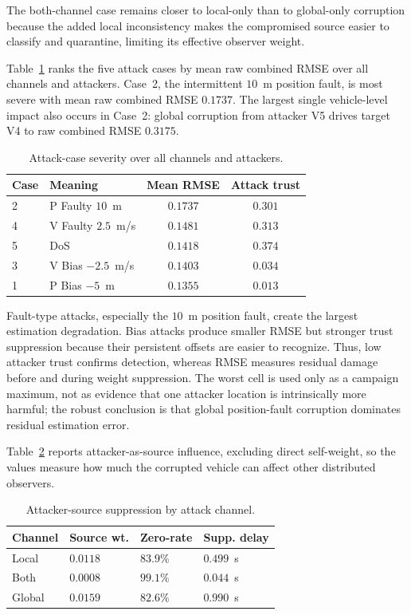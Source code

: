 \documentclass[letterpaper,journal]{IEEEtran}
\begin{document}
The both-channel case remains closer to local-only than to global-only corruption because the added local inconsistency makes the compromised source easier to classify and quarantine, limiting its effective observer weight.

Table~\ref{tab:case_ranking} ranks the five attack cases by mean raw combined RMSE over all channels and attackers. Case~2, the intermittent $10$~m position fault, is most severe with mean raw combined RMSE $0.1737$. The largest single vehicle-level impact also occurs in Case~2: global corruption from attacker V5 drives target V4 to raw combined RMSE $0.3175$.

\begin{table}[!t]
\centering
\caption{Attack-case severity over all channels and attackers.}
\label{tab:case_ranking}
\scriptsize
\begin{tabular}{p{0.7cm}p{2.55cm}cc}
\toprule
\textbf{Case} & \textbf{Meaning} & \textbf{Mean RMSE} & \textbf{Attack trust} \\
\midrule
2 & P Faulty $10$~m        & $0.1737$ & $0.301$ \\
4 & V Faulty $2.5$~m/s     & $0.1481$ & $0.313$ \\
5 & DoS                    & $0.1418$ & $0.374$ \\
3 & V Bias $-2.5$~m/s      & $0.1403$ & $0.034$ \\
1 & P Bias $-5$~m          & $0.1355$ & $0.013$ \\
\bottomrule
\end{tabular}
\end{table}

Fault-type attacks, especially the $10$~m position fault, create the largest estimation degradation. Bias attacks produce smaller RMSE but stronger trust suppression because their persistent offsets are easier to recognize. Thus, low attacker trust confirms detection, whereas RMSE measures residual damage before and during weight suppression. The worst cell is used only as a campaign maximum, not as evidence that one attacker location is intrinsically more harmful; the robust conclusion is that global position-fault corruption dominates residual estimation error.

Table~\ref{tab:source_suppression_by_channel} reports attacker-as-source influence, excluding direct self-weight, so the values measure how much the corrupted vehicle can affect other distributed observers.

\begin{table}[!t]
\centering
\caption{Attacker-source suppression by attack channel.}
\label{tab:source_suppression_by_channel}
\scriptsize
\begin{tabular}{p{1.0cm}p{1.45cm}p{1.25cm}p{1.65cm}}
\toprule
\textbf{Channel} & \textbf{Source wt.} & \textbf{Zero-rate} & \textbf{Supp. delay} \\
\midrule
Local  & $0.0118$ & $83.9\%$ & $0.499$~s \\
Both   & $0.0008$ & $99.1\%$ & $0.044$~s \\
Global & $0.0159$ & $82.6\%$ & $0.990$~s \\
\bottomrule
\end{tabular}
\end{table}
\end{document}
